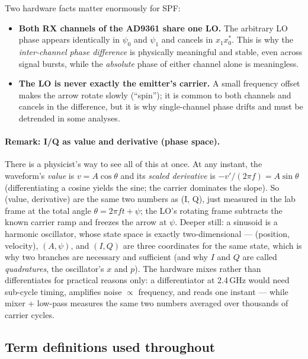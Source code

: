 Two hardware facts matter enormously for SPF:
\begin{itemize}
  \item \textbf{Both RX channels of the AD9361 share one LO.} The arbitrary
        LO phase appears identically in $\psi_0$ and $\psi_1$ and cancels in
        $x_1 x_0^{*}$. This is why the \emph{inter-channel phase difference}
        is physically meaningful and stable, even across signal bursts, while
        the \emph{absolute} phase of either channel alone is meaningless.
  \item \textbf{The LO is never exactly the emitter's carrier.} A small
        frequency offset makes the arrow rotate slowly (``spin''); it is
        common to both channels and cancels in the difference, but it is why
        single-channel phase drifts and must be detrended in some analyses.
\end{itemize}

\paragraph{Remark: I/Q as value and derivative (phase space).}
There is a physicist's way to see all of this at once. At any instant, the
waveform's \emph{value} is $v = A\cos\theta$ and its \emph{scaled
derivative} is $-v'/(2\pi f) = A\sin\theta$ (differentiating a cosine
yields the sine; the carrier dominates the slope). So (value, derivative) are
the same two numbers as (I, Q), just measured in the lab frame at the total
angle $\theta = 2\pi f t + \psi$; the LO's rotating frame subtracts the
known carrier ramp and freezes the arrow at $\psi$. Deeper still: a sinusoid
is a harmonic oscillator, whose state space is exactly two-dimensional ---
(position, velocity), $(A, \psi)$, and $(I, Q)$ are three coordinates for the
same state, which is why two branches are necessary and sufficient (and why
$I$ and $Q$ are called \emph{quadratures}, the oscillator's $x$ and $p$).
The hardware mixes rather than differentiates for practical reasons only: a
differentiator at 2.4\,GHz would need sub-cycle timing, amplifies noise
$\propto$ frequency, and reads one instant --- while mixer + low-pass
measures the same two numbers averaged over thousands of carrier cycles.

\subsection{Term definitions used throughout}
\label{sec:terms}


